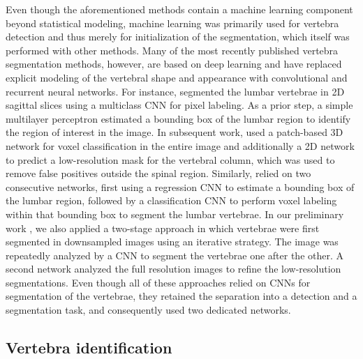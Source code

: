 \documentclass[authoryear,5p,final,times]{elsarticle}
\begin{document}
    Even though the aforementioned methods contain a machine learning component beyond statistical modeling, machine learning was primarily used for vertebra detection and thus merely for initialization of the segmentation, which itself was performed with other methods. Many of the most recently published vertebra segmentation methods, however, are based on deep learning and have replaced explicit modeling of the vertebral shape and appearance with convolutional and recurrent neural networks. For instance, \citet{Sekuboyina2017} segmented the lumbar vertebrae in 2D sagittal slices using a multiclass CNN for pixel labeling. As a prior step, a simple multilayer perceptron estimated a bounding box of the lumbar region to identify the region of interest in the image. In subsequent work, \citet{Sekuboyina2018} used a patch-based 3D network for voxel classification in the entire image and additionally a 2D network to predict a low-resolution mask for the vertebral column, which was used to remove false positives outside the spinal region. Similarly, \citet{Janssens2018} relied on two consecutive networks, first using a regression CNN to estimate a bounding box of the lumbar region, followed by a classification CNN to perform voxel labeling within that bounding box to segment the lumbar vertebrae. In our preliminary work \citep{Lessmann2018b}, we also applied a two-stage approach in which vertebrae were first segmented in downsampled images using an iterative strategy. The image was repeatedly analyzed by a CNN to segment the vertebrae one after the other. A second network analyzed the full resolution images to refine the low-resolution segmentations. Even though all of these approaches relied on CNNs for segmentation of the vertebrae, they retained the separation into a detection and a segmentation task, and consequently used two dedicated networks.

    \subsection{Vertebra identification}
\end{document}
